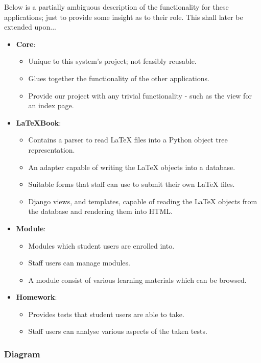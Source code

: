 		Below is a partially ambiguous description of the functionality for these applications; just to provide some insight as to their role. This shall later be extended upon...
		
		\begin{itemize}
			\item \textbf{Core}:
				\begin{itemize}
					\item Unique to this system's project; not feasibly reusable.
					\item Glues together the functionality of the other applications.
					\item Provide our project with any trivial functionality - such as the view for an index page.
				\end{itemize}

			\item \textbf{LaTeXBook}:
				\begin{itemize}
					\item Contains a parser to read LaTeX files into a Python object tree representation.
					\item An adapter capable of writing the LaTeX objects into a database.
					\item Suitable forms that staff can use to submit their own LaTeX files.
					\item Django views, and templates, capable of reading the LaTeX objects from the database and rendering them into HTML.
				\end{itemize}
				
			\item \textbf{Module}:
				\begin{itemize}
					\item Modules which student users are enrolled into.
					\item Staff users can manage modules.
					\item A module consist of various learning materials which can be browsed.
				\end{itemize} 

			\item \textbf{Homework}:
				\begin{itemize}
					\item Provides tests that student users are able to take.
					\item Staff users can analyse various aspects of the taken tests.
				\end{itemize} 
		\end{itemize}
	
	\subsubsection{Diagram}